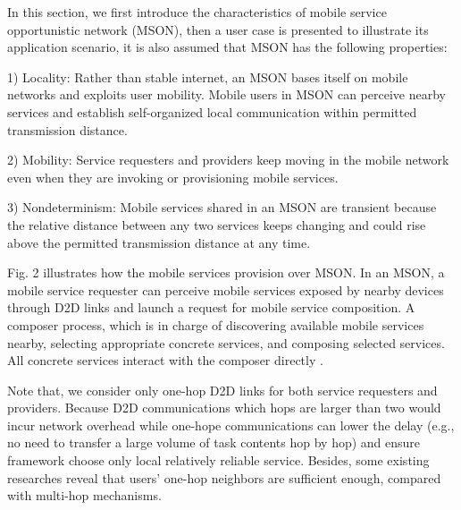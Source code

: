 \documentclass[10pt,journal,compsoc]{IEEEtran}
\begin{document}
In this section, we first introduce the characteristics of mobile service opportunistic network (MSON), then a user case is presented to illustrate its application scenario, it is also assumed that MSON has the following properties:

1) Locality: Rather than stable internet, an MSON bases itself on mobile networks and exploits user mobility. Mobile users in MSON can perceive nearby services and establish self-organized local communication within permitted transmission distance.

2) Mobility: Service requesters and providers keep moving in the mobile network even when they are invoking or provisioning mobile services.

3) Nondeterminism: Mobile services shared in an MSON are transient because the relative distance between any two services keeps changing and could rise above the permitted transmission distance at any time. 

Fig. 2 illustrates how the mobile services provision over MSON. In an MSON, a mobile service requester can perceive mobile services exposed by nearby devices through D2D links and launch a request for mobile service composition. A composer process, which is in charge of discovering available mobile services nearby, selecting appropriate concrete services, and composing selected services. All concrete services interact with the composer directly \cite{Deng2017}.

Note that, we consider only one-hop D2D links for both service requesters and providers. 
Because D2D communications which hops are larger than two would incur network overhead \cite{li2014can} while one-hope communications can lower the delay (e.g., no need to transfer a large volume of task contents hop by hop) and ensure framework choose only local relatively reliable service. 
Besides, some existing researches \cite{chang2015progressive,tuncay2013participant,wu2013homing,jiang2016exploiting,liu2013exploring} reveal that users' one-hop neighbors are sufficient enough, compared with multi-hop mechanisms.
\end{document}
